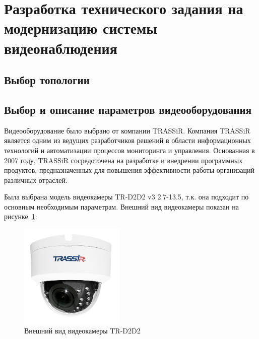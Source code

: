 \section{Разработка технического задания на модернизацию системы видеонаблюдения}

\subsection{Выбор топологии}

\subsection{Выбор и описание параметров видеооборудования}

Видеооборудование было выбрано от компании TRASSiR\@.
Компания TRASSiR является одним из ведущих разработчиков решений в области информационных технологий и автоматизации процессов мониторинга и управления.
Основанная в 2007 году, TRASSiR сосредоточена на разработке и внедрении программных продуктов, предназначенных для повышения эффективности работы организаций различных отраслей.

Была выбрана модель видеокамеры TR-D2D2 v3 2.7-13.5, т.к. она подходит по основным необходимым параметрам.
Внешний вид видеокамеры показан на рисунке~\ref{fig::tr-d2d2}:

\begin{figure}[h]
    \begin{center}
        \includegraphics[width=50mm]{images/TR-D2D2}
    \end{center}
    \captionsetup{justification=centering}
    \caption{Внешний вид видеокамеры TR-D2D2}
    \label{fig::tr-d2d2}
\end{figure}

